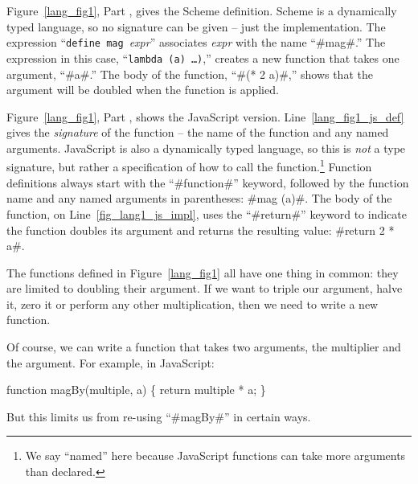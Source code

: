 \documentclass[12pt]{report}
\begin{document}
Figure~\ref{lang_fig1}, Part , gives the
Scheme definition. Scheme is a dynamically typed language, so no
signature can be given -- just the implementation. The expression
``\texttt{define mag}\ \emph{expr}'' associates \emph{expr} with the
name ``#mag#.'' The expression in this case, ``\texttt{lambda (a)
  \ldots)},'' creates a new function that takes one argument, ``#a#.''
The body of the function, ``#(* 2 a)#,'' shows that the argument will
be doubled when the function is applied.


Figure~\ref{lang_fig1}, Part , shows the
JavaScript version. Line~\ref{lang_fig1_js_def} gives the
\emph{signature} of the function -- the name of the function and any
named arguments. JavaScript is also a dynamically typed language, so
this is \emph{not} a type signature, but rather a specification of how
to call the function.\footnote{We say ``named'' here because JavaScript functions
can take more arguments than declared.}  Function definitions always start with the
``#function#'' keyword, followed by the function name and any
named arguments in parentheses: #mag (a)#. The body of the function,
on Line~\ref{fig_lang1_js_impl}, uses the ``#return#'' keyword to
indicate the function doubles its argument and returns the resulting
value: #return 2 * a#.

The functions defined in Figure~\ref{lang_fig1} all have one thing in
common: they are limited to doubling their argument. If we want to
triple our argument, halve it, zero it or perform any other
multiplication, then we need to write a new function.

Of course, we can write a function that takes two arguments, the
multiplier and the argument. For example, in JavaScript:
\begin{AVerb}
function magBy(multiple, a) \{
  return multiple * a;
\}
\end{AVerb}
But this limits us from re-using ``#magBy#'' in certain ways. 
\end{document}
